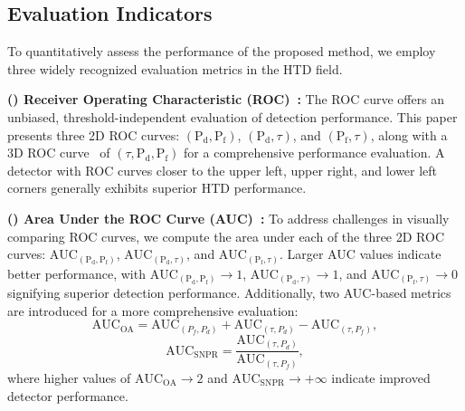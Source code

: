 \subsection{Evaluation Indicators}\label{sec:4.1}
To quantitatively assess the performance of the proposed method, we employ three widely recognized evaluation metrics in the HTD field.
\par
\textbf{() Receiver Operating Characteristic (ROC)~\cite{ROC, ROC3D}:} 
The ROC curve offers an unbiased, threshold-independent evaluation of detection performance. This paper presents three 2D ROC curves: $( \mathrm{P}_{\mathrm{d}}, \mathrm{P}_{\mathrm{f}})$, $( \mathrm{P}_{\mathrm{d}}, \tau)$, and $( \mathrm{P}_{\mathrm{f}}, \tau)$, along with a 3D ROC curve~\cite{ROC3D} of $(\tau, \mathrm{P}_{\mathrm{d}}, \mathrm{P}_{\mathrm{f}})$ for a comprehensive performance evaluation. A detector with ROC curves closer to the upper left, upper right, and lower left corners generally exhibits superior HTD performance.
\par
\textbf{() Area Under the ROC Curve (AUC)~\cite{Zhang2015}:} 
To address challenges in visually comparing ROC curves, we compute the area under each of the three 2D ROC curves: $\text{AUC}_{( \mathrm{P}_{\mathrm{d}}, \mathrm{P}_{\mathrm{f}})}$, $\text{AUC}_{( \mathrm{P}_{\mathrm{d}}, \tau)}$, and $\text{AUC}_{( \mathrm{P}_{\mathrm{f}}, \tau)}$. Larger AUC values indicate better performance, with $\text{AUC}_{( \mathrm{P}_{\mathrm{d}}, \mathrm{P}_{\mathrm{f}})} \to 1$, $\text{AUC}_{( \mathrm{P}_{\mathrm{d}}, \tau)} \to 1$, and $\text{AUC}_{( \mathrm{P}_{\mathrm{f}}, \tau)} \to 0$ signifying superior detection performance. Additionally, two AUC-based metrics are introduced for a more comprehensive evaluation:
\begin{equation}
    \mathrm{AUC}_{\mathrm{OA}} = \mathrm{AUC}_{\left(P_f, P_d\right)} + \mathrm{AUC}_{\left(\tau, P_d\right)} - \mathrm{AUC}_{\left(\tau, P_f\right)},
\end{equation}
\begin{equation}
    \mathrm{AUC}_{\mathrm{SNPR}} = \frac{\mathrm{AUC}_{\left(\tau, P_d\right)}}{\mathrm{AUC}_{\left(\tau, P_f\right)}},
\end{equation}
where higher values of $\mathrm{AUC}_{\mathrm{OA}} \to 2$ and $\mathrm{AUC}_{\mathrm{SNPR}} \to +\infty$ indicate improved detector performance.
